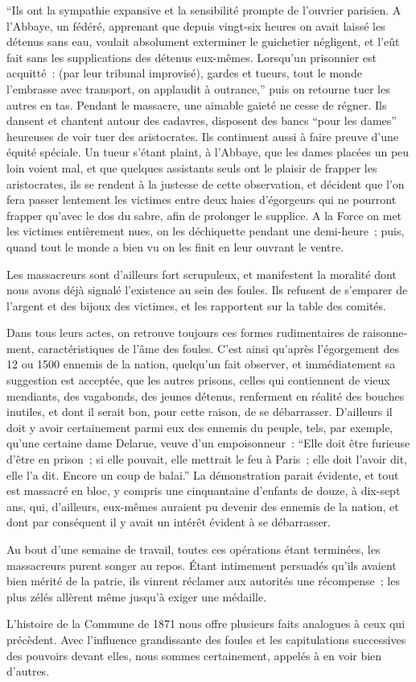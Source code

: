 \documentclass[french,twoside]{book} %
\begin{document}
“Ils ont la sympathie expansive et la sensibilité prompte de l’ouvrier parisien. A l’Abbaye, un fédéré, apprenant que depuis vingt-six heures on avait laissé les détenus sans eau, voulait absolument exterminer le guichetier négligent, et l’eût fait sans les supplications des détenus eux-mêmes. Lorsqu’un prisonnier est acquitté : (par leur tribunal improvisé), gardes et tueurs, tout le monde l’embrasse avec transport, on applaudit à outrance,” puis on retourne tuer les autres en tas. Pendant le massacre, une aimable gaieté ne cesse de régner. Ils dansent et chantent autour des cadavres, disposent des bancs “pour les dames” heureuses de voir tuer des aristocrates. Ils continuent aussi à faire preuve d’une équité spéciale. Un tueur s’étant plaint, à l’Abbaye, que les dames placées un peu loin voient mal, et que quel­ques assistants seuls ont le plaisir de frapper les aristocrates, ils se rendent à la justesse de cette observation, et décident que l’on fera passer lentement les victimes entre deux haies d’égorgeurs qui ne pourront frapper qu’avec le dos du sabre, afin de prolonger le supplice. A la Force on met les victimes entièrement nues, on les déchiquette pendant une demi-heure ; puis, quand tout le monde a bien vu on les finit en leur ouvrant le ventre.\par
Les massacreurs sont d’ailleurs fort scrupuleux, et manifestent la moralité dont nous avons déjà signalé l’existence au sein des foules. Ils refusent de s’emparer de l’argent et des bijoux des victimes, et les rapportent sur la table des comités.\par
Dans tous leurs actes, on retrouve toujours ces formes rudimentaires de raisonne­ment, caractéristiques de l’âme des foules. C’est ainsi qu’après l’égorgement des 12 ou 1500 ennemis de la nation, quelqu’un fait observer, et immédiatement sa suggestion est acceptée, que les autres prisons, celles qui contiennent de vieux mendiants, des vagabonds, des jeunes détenus, renferment en réalité des bouches inutiles, et dont il serait bon, pour cette raison, de se débarrasser. D’ail­leurs il doit y avoir certainement parmi eux des ennemis du peuple, tels, par exemple, qu’une certaine dame Delarue, veuve d’un empoisonneur : “Elle doit être furieuse d’être en prison ; si elle pouvait, elle mettrait le feu à Paris ; elle doit l’avoir dit, elle l’a dit. Encore un coup de balai.” La démonstration parait évidente, et tout est massacré en bloc, y compris une cin­quantaine d’enfants de douze, à dix-sept ans, qui, d’ailleurs, eux-mêmes auraient pu devenir des ennemis de la nation, et dont par conséquent il y avait un intérêt évident à se débarrasser.\par
Au bout d’une semaine de travail, toutes ces opérations étant terminées, les massa­creurs purent songer au repos. Étant intimement persuadés qu’ils avaient bien mérité de la patrie, ils vinrent réclamer aux autorités une récompense ; les plus zélés allèrent même jusqu’à exiger une médaille.\par
L’histoire de la Commune de 1871 nous offre plusieurs faits analogues à ceux qui précèdent. Avec l’influence grandissante des foules et les capitulations successives des pouvoirs devant elles, nous sommes certainement, appelés à en voir bien d’autres.
\end{document}
